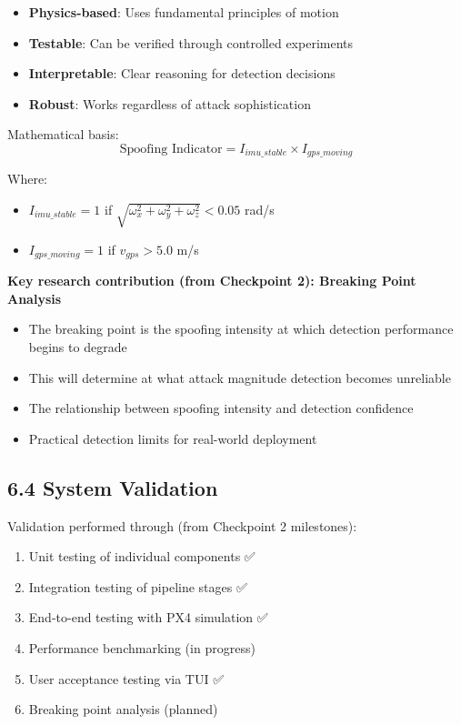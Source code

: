\documentclass[12pt,a4paper]{article}
\begin{document}
\begin{itemize}
    \item \textbf{Physics-based}: Uses fundamental principles of motion
    \item \textbf{Testable}: Can be verified through controlled experiments
    \item \textbf{Interpretable}: Clear reasoning for detection decisions
    \item \textbf{Robust}: Works regardless of attack sophistication
\end{itemize}

Mathematical basis:
\begin{equation}
\text{Spoofing Indicator} = I_{imu\_stable} \times I_{gps\_moving}
\end{equation}

Where:
\begin{itemize}
    \item $I_{imu\_stable} = 1$ if $\sqrt{\omega_x^2 + \omega_y^2 + \omega_z^2} < 0.05$ rad/s
    \item $I_{gps\_moving} = 1$ if $v_{gps} > 5.0$ m/s
\end{itemize}

\textbf{Key research contribution (from Checkpoint 2): Breaking Point Analysis}
\begin{itemize}
    \item The breaking point is the spoofing intensity at which detection performance begins to degrade
    \item This will determine at what attack magnitude detection becomes unreliable
    \item The relationship between spoofing intensity and detection confidence
    \item Practical detection limits for real-world deployment
\end{itemize}

\subsection{6.4 System Validation}

Validation performed through (from Checkpoint 2 milestones):

\begin{enumerate}
    \item Unit testing of individual components ✅
    \item Integration testing of pipeline stages ✅
    \item End-to-end testing with PX4 simulation ✅
    \item Performance benchmarking (in progress)
    \item User acceptance testing via TUI ✅
    \item Breaking point analysis (planned)
\end{enumerate}
\end{document}
